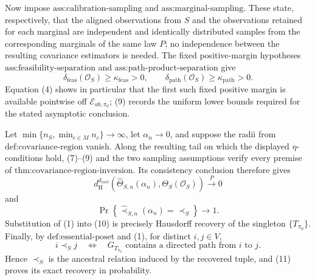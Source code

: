 Now impose \(\text{ass:calibration-sampling}\) and \(\text{ass:marginal-sampling}\).  These state, respectively, that the aligned observations from \(S\) and the observations retained for each marginal are independent and identically distributed samples from the corresponding marginals of the same law \(P\); no independence between the resulting covariance estimators is needed.  The fixed positive-margin hypotheses \(\text{ass:feasibility-separation}\) and \(\text{ass:path-product-separation}\) give
\[
\delta_{\mathrm{feas}}(\mathcal O_S)
\ge \kappa_{\mathrm{feas}}>0,
\qquad
\delta_{\mathrm{path}}(\mathcal O_S)
\ge \kappa_{\mathrm{path}}>0.
\tag{9}
\]
Equation (4) shows in particular that the first such fixed positive margin is available pointwise off \(\mathcal E_{ab,\pi_0}\); (9) records the uniform lower bounds required for the stated asymptotic conclusion.

Let \(\min\{n_S,\min_{c\in M}n_c\}\to\infty\), let \(\alpha_n\to0\), and suppose the radii from \(\text{def:covariance-region}\) vanish.  Along the resulting tail on which the displayed \(\eta\)-conditions hold, (7)--(9) and the two sampling assumptions verify every premise of \(\text{thm:covariance-region-inversion}\).  Its consistency conclusion therefore gives
\[
d_{\mathrm H}^{d_{\mathrm{coef}}}
\left(
\widehat\Theta_{S,n}(\alpha_n),
\Theta_S(\mathcal O_S)
\right)
\xrightarrow{P}0
\tag{10}
\]
and
\[
\Pr\!\left\{
\widehat\prec_{S,n}(\alpha_n)=\prec_S
\right\}
\longrightarrow1.
\tag{11}
\]
Substitution of (1) into (10) is precisely Hausdorff recovery of the singleton \(\{T_{\pi_0}\}\).  Finally, by \(\text{def:essential-poset}\) and (1), for distinct \(i,j\in V\),
\[
i\prec_S j
\quad\Longleftrightarrow\quad
G_{T_{\pi_0}}\text{ contains a directed path from }i\text{ to }j.
\tag{12}
\]
Hence \(\prec_S\) is the ancestral relation induced by the recovered tuple, and (11) proves its exact recovery in probability.
